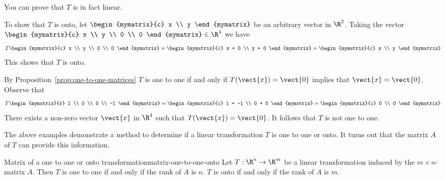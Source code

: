 \begin{solution}
You can prove that $T$ is in fact linear.

To show that $T$ is onto, let $\begin{mymatrix}{c}
x \\
y
\end{mymatrix}$ be an arbitrary vector in $\R^2$. Taking the vector $\begin{mymatrix}{c}
x \\
y \\
0 \\
0
\end{mymatrix} \in \R^4$ we have
\[
T \begin{mymatrix}{c}
x \\
y \\
0 \\
0
\end{mymatrix} =
\begin{mymatrix}{c}
x + 0 \\
y + 0
\end{mymatrix}
= \begin{mymatrix}{c}
x \\
y
\end{mymatrix}
\]
This shows that $T$ is onto.

By Proposition~\ref{prop:one-to-one-matrices} $T$ is one to one if and only if $T(\vect{x}) = \vect{0}$ implies that $\vect{x} = \vect{0}$. Observe that
\[
T \begin{mymatrix}{r}
1 \\
0 \\
0 \\
-1
\end{mymatrix} =
\begin{mymatrix}{c}
1 + -1 \\
0 + 0
\end{mymatrix}
= \begin{mymatrix}{c}
0 \\
0
\end{mymatrix}
\]
There exists a non-zero vector $\vect{x}$ in $\R^4$ such that $T(\vect{x}) = \vect{0}$. It follows that $T$ is not one to one.
\end{solution}

The above examples demonstrate a method to determine if a linear transformation $T$ is one to one or onto. It turns out that the matrix $A$ of $T$ can provide this information.

\begin{theorem}{Matrix of a one to one or onto transformation}{matrix-one-to-one-onto}
Let $T: \R^n \to \R^m$ be a linear transformation induced by the $m \times n$-matrix $A$. Then $T$ is one to one if and only if the rank of $A$ is $n$. $T$ is onto if and only if the rank of $A$ is $m$.
\end{theorem}

